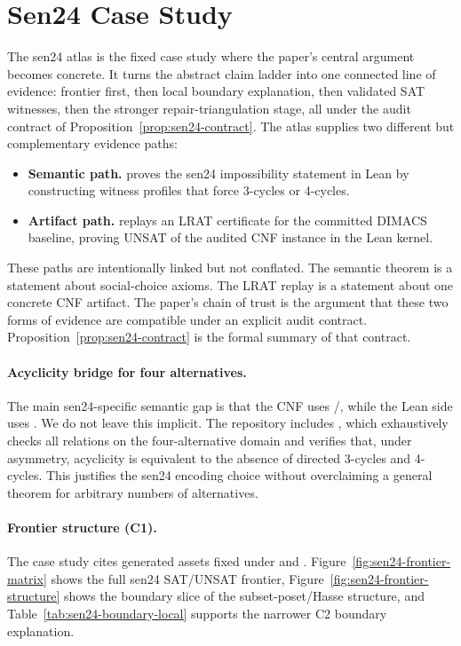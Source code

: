 \section{Sen24 Case Study}

The sen24 atlas is the fixed case study where the paper's central argument becomes concrete.
It turns the abstract claim ladder into one connected line of evidence: frontier first, then local boundary explanation, then validated SAT witnesses, then the stronger repair-triangulation stage, all under the audit contract of Proposition~\ref{prop:sen24-contract}.
The atlas supplies two different but complementary evidence paths:
\begin{itemize}[leftmargin=*]
  \item \textbf{Semantic path.}  proves the sen24 impossibility statement in Lean by constructing witness profiles that force 3-cycles or 4-cycles.
  \item \textbf{Artifact path.}  replays an LRAT certificate for the committed DIMACS baseline, proving UNSAT of the audited CNF instance in the Lean kernel.
\end{itemize}

These paths are intentionally linked but not conflated. The semantic theorem is a statement about social-choice axioms. The LRAT replay is a statement about one concrete CNF artifact. The paper's chain of trust is the argument that these two forms of evidence are compatible under an explicit audit contract.
Proposition~\ref{prop:sen24-contract} is the formal summary of that contract.

\paragraph{Acyclicity bridge for four alternatives.}
The main sen24-specific semantic gap is that the CNF uses /, while the Lean side uses .
We do not leave this implicit. The repository includes , which exhaustively checks all relations on the four-alternative domain and verifies that, under asymmetry, acyclicity is equivalent to the absence of directed 3-cycles and 4-cycles.
This justifies the sen24 encoding choice without overclaiming a general theorem for arbitrary numbers of alternatives.

\paragraph{Frontier structure (C1).}
The case study cites generated assets fixed under  and .
Figure~\ref{fig:sen24-frontier-matrix} shows the full sen24 SAT/UNSAT frontier, Figure~\ref{fig:sen24-frontier-structure} shows the boundary slice of the subset-poset/Hasse structure, and Table~\ref{tab:sen24-boundary-local} supports the narrower C2 boundary explanation.

